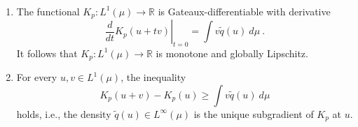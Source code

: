 \documentclass[graybox]{svmult}
\begin{document}
\begin{proposition}
\ \label{prop:subgradient}
%
\begin{enumerate}
\item \label{item:subgradient1} The functional $K_{p}\colon L^{1}(\mu )\rightarrow \mathbb{R}$ is
Gateaux-differentiable with derivative 
\begin{equation*}
\left. \frac{d}{dt}K_{p}(u+tv)\right\vert _{t=0}=\int v\widetilde{q}(u)\
d\mu \ .
\end{equation*}
It follows that $K_{p}\colon L^{1}(\mu )\rightarrow \mathbb{R}$ is monotone and globally Lipschitz.
\item For every $u,v\in L^{1}(\mu )$, the inequality 
\begin{equation*}
K_{p}(u+v)-K_{p}(u)\geq \int v\widetilde{q}(u)\ d\mu
\end{equation*}
holds, i.e., the density $\widetilde{q}(u)\in L^{\infty }(\mu )$ is the
unique subgradient of $K_{p}$ at $u$.
\end{enumerate}
\end{proposition}
%
\end{document}
